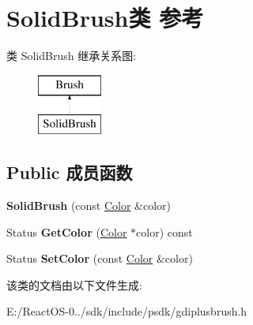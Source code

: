 \hypertarget{class_solid_brush}{}\section{Solid\+Brush类 参考}
\label{class_solid_brush}
类 Solid\+Brush 继承关系图\+:\begin{figure}[H]
\begin{center}
\leavevmode
\includegraphics[height=2.000000cm]{class_solid_brush}
\end{center}
\end{figure}
\subsection*{Public 成员函数}
\begin{DoxyCompactItemize}
\item 
\mbox{\label{class_solid_brush_ab926695e84e73a93527ba9f3a67b02c6}} 
{\bfseries Solid\+Brush} (const \hyperlink{struct_color}{Color} \&color)
\item 
\mbox{\label{class_solid_brush_afb9b00915177f60ff085a255aed63b7d}} 
Status {\bfseries Get\+Color} (\hyperlink{struct_color}{Color} $\ast$color) const
\item 
\mbox{\label{class_solid_brush_a945bee04d1acd85ec904bd8ef89bd4f3}} 
Status {\bfseries Set\+Color} (const \hyperlink{struct_color}{Color} \&color)
\end{DoxyCompactItemize}


该类的文档由以下文件生成\+:\begin{DoxyCompactItemize}
\item 
E\+:/\+React\+O\+S-\/0../sdk/include/psdk/gdiplusbrush.\+h\end{DoxyCompactItemize}
